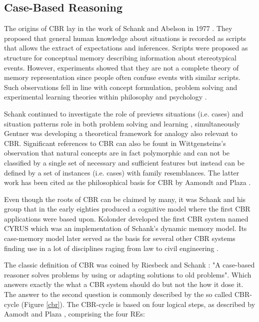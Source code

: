 \subsection{Case-Based Reasoning}
\label{History} The origins of CBR lay in the work of 
Schank and Abelson in 1977 \cite{Schank_Abelson_1977}. They proposed that general 
human knowledge about situations is recorded as scripts that allows the extract 
of expectations and inferences. Scripts were proposed as structure for conceptual 
memory describing information about stereotypical events. However, experiments 
showed that they are not a complete theory of memory representation since people 
often confuse events with similar scripts. Such observations fell in line with 
concept formulation, problem solving and experimental learning theories within 
philosophy and psychology \cite{tulving_1977,smith_1978}. 

Schank continued to investigate the role of previews situations (i.e. cases) 
and situation patterns role in both problem solving and learning \cite{Schank_1982},  
simultaneously Gentner \cite{genter_1983} was developing a  
theoretical framework for analogy also relevant to CBR. Significant references to CBR can also be fount in 
Wittgensteins's observation \cite{wittgestein_1953} that natural concepts are in fact 
polymorphic and can not be classified by a single set of necessary and sufficient 
features but instead can be defined by a set of instances (i.e. cases) with family 
resemblances. The latter work has been cited as the philosophical basis for CBR by Aamondt and Plaza \cite{aamond_plaza_1994}.

Even though the roots of CBR can be claimed by many, it was Schank and his group that in the early eighties produced a cognitive model where the first CBR applications were based upon. Kolonder developed the first CBR system named CYRUS \cite{kolodner_1983a,kolodner_1983b} which was an implementation of Schank's dynamic memory model. Its case-memory model later served as the basis for several other CBR systems finding use in a lot of disciplines raging from law \cite{ashley_1988,rissland_skalak_1989} to civil engineering \cite{whatson_abdullah_1994,moore_1994}.

\label {CBR}  The classic definition of CBR was coined by Riesbeck and Schank \cite{riesbeck_1989}: "A case-based reasoner solves problems by using or adapting solutions to old problems". Which answers exactly the what a CBR system should do but not the how it dose it. The answer to the second question is commonly described by the so called CBR-cycle (Figure \ref{cbr}).  The CBR-cycle is based on four logical steps, as described by Aamodt and Plaza \cite{aamond_plaza_1994}, comprising the four REs: 

